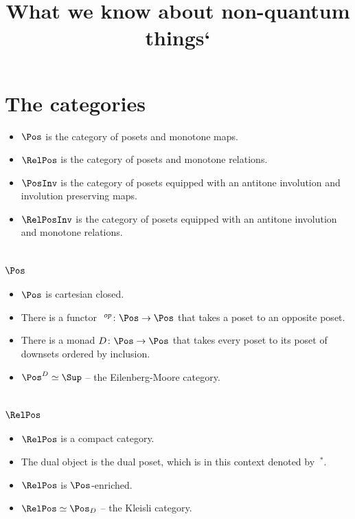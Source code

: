 \documentclass{article}
\theoremstyle{definition}
\begin{document}
\title{What we know about non-quantum things`}
\section{The categories}
\begin{itemize}
\item $\Pos$ is the category of posets and monotone maps.
\item $\RelPos$ is the category of posets and monotone relations.
\item $\PosInv$ is the category of posets equipped with an antitone involution and involution preserving maps.
\item $\RelPosInv$ is the category of posets equipped with an antitone involution and monotone relations. 
\end{itemize}

\section{$\Pos$}

\begin{itemize}
\item $\Pos$ is cartesian closed.
\item There is a functor $~^{op}\colon\Pos\to\Pos$ that takes a poset to an opposite poset.
\item There is a monad $D\colon\Pos\to\Pos$ that takes every poset to its poset of downsets ordered by inclusion.
\item $\Pos^D\simeq\Sup$ -- the Eilenberg-Moore category.
\end{itemize}

\section{$\RelPos$}

\begin{itemize}
\item $\RelPos$ is a compact category.
\item The dual object is the dual poset, which is in this context denoted by $~^*$.
\item $\RelPos$ is $\Pos$-enriched.
\item $\RelPos\simeq\Pos_D$ -- the Kleisli category.
\end{itemize}
\end{document}
